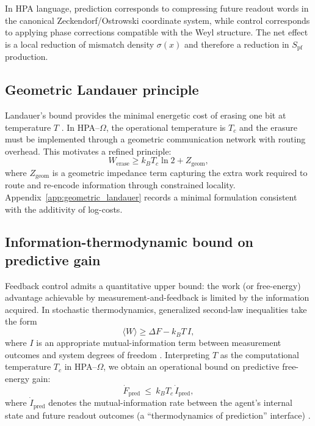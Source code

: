 In HPA language, prediction corresponds to compressing future readout words in the canonical Zeckendorf/Ostrowski coordinate system, while control corresponds to applying phase corrections compatible with the Weyl structure. The net effect is a local reduction of mismatch density $\sigma(x)$ and therefore a reduction in $S_{\mathrm{pf}}$ production.

\subsection{Geometric Landauer principle}

Landauer's bound provides the minimal energetic cost of erasing one bit at temperature $T$ \cite{Landauer1961}. In HPA--$\Omega$, the operational temperature is $T_c$ and the erasure must be implemented through a geometric communication network with routing overhead. This motivates a refined principle:
\begin{equation}
W_{\mathrm{erase}} \ge k_B T_c \ln 2 + Z_{\mathrm{geom}},
\label{eq:geometric_landauer}
\end{equation}
where $Z_{\mathrm{geom}}$ is a geometric impedance term capturing the extra work required to route and re-encode information through constrained locality. Appendix~\ref{app:geometric_landauer} records a minimal formulation consistent with the additivity of log-costs.

\subsection{Information-thermodynamic bound on predictive gain}

Feedback control admits a quantitative upper bound: the work (or free-energy) advantage achievable by measurement-and-feedback is limited by the information acquired. In stochastic thermodynamics, generalized second-law inequalities take the form
\begin{equation}
  \langle W\rangle \ge \Delta F - k_B T\, I,
\end{equation}
where $I$ is an appropriate mutual-information term between measurement outcomes and system degrees of freedom \cite{SagawaUeda2010,ParrondoHorowitzSagawa2015}. Interpreting $T$ as the computational temperature $T_c$ in HPA--$\Omega$, we obtain an operational bound on predictive free-energy gain:
\begin{equation}
  \dot F_{\mathrm{pred}} \ \le\ k_B T_c\,\dot I_{\mathrm{pred}},
\label{eq:info_bound}
\end{equation}
where $\dot I_{\mathrm{pred}}$ denotes the mutual-information rate between the agent's internal state and future readout outcomes (a ``thermodynamics of prediction'' interface) \cite{StillSivakBellCrooks2012}.

